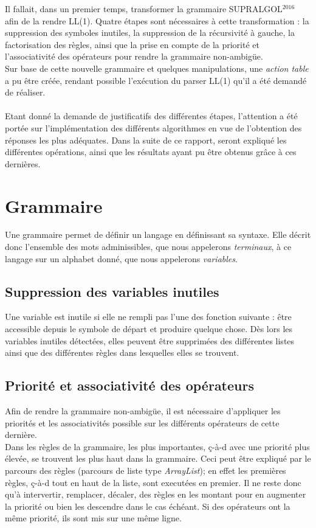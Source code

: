 \documentclass[pdftex,10pt,a4paper]{article} \usepackage[utf8]{inputenc}
\begin{document}
Il fallait, dans un premier temps, transformer la grammaire SUPRALGOL$^{2016}$ afin de la rendre LL(1). Quatre étapes sont nécessaires à cette transformation : la suppression des symboles inutiles, la suppression de la récursivité à gauche, la factorisation des règles, ainsi que la prise en compte de la priorité et l'associativité des opérateurs pour rendre la grammaire non-ambigüe.\\ Sur base de cette nouvelle grammaire et quelques manipulations, une \textit{action table} a pu être créée, rendant possible l'exécution du parser LL(1) qu'il a été demandé de réaliser.\\\\

Etant donné la demande de justificatifs des différentes étapes, l'attention a été portée sur l'implémentation des différents algorithmes en vue de l'obtention des réponses les plus adéquates. Dans la suite de ce rapport, seront expliqué les différentes opérations, ainsi que les résultats ayant pu être obtenus grâce à ces dernières.

\section{Grammaire}

Une grammaire permet de définir un langage en définissant sa syntaxe. Elle décrit donc l'ensemble des mots adminissibles, que nous appelerons \textit{terminaux}, à ce langage sur un alphabet donné, que nous appelerons \textit{variables}. 

\subsection{Suppression des variables inutiles}

Une variable est inutile si elle ne rempli pas l'une des fonction suivante : être accessible depuis le symbole de départ et produire quelque chose. Dès lors les variables inutiles détectées, elles peuvent être supprimées des différentes listes ainsi que des différentes règles dans lesquelles elles se trouvent. 

\subsection{Priorité et associativité des opérateurs}
Afin de rendre la grammaire non-ambigüe, il est nécessaire d'appliquer les priorités et les associativités possible sur les différents opérateurs de cette dernière.\\ Dans les règles de la grammaire, les plus importantes, ç-à-d avec une priorité plus élevée, se trouvent les plus haut dans la grammaire. Ceci peut être expliqué par le parcours des règles (parcours de liste type \textit{ArrayList}); en effet les premières règles, ç-à-d tout en haut de la liste, sont executées en premier. Il ne reste donc qu'à intervertir, remplacer, décaler, des règles en les montant pour en augmenter la priorité ou bien les descendre dans le cas échéant. Si des opérateurs ont la même priorité, ils sont mis sur une même ligne.
\end{document}
